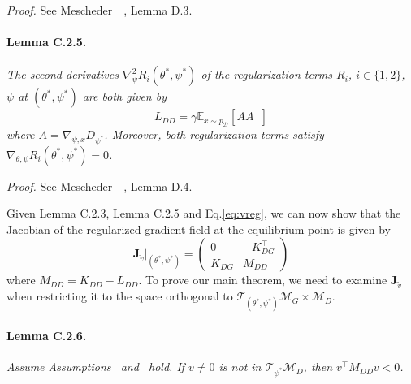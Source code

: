 \emph{Proof.} See Mescheder~\etal~\cite{r1}, Lemma D.3.

\paragraph{Lemma C.2.5.} \emph{The second derivatives $\nabla^2_\psi R_i(\theta^*,\psi^*)$ of the regularization terms $R_i$, $i\in\{1,2\}$,~\wrt $\psi$ at $(\theta^*,\psi^*)$ are both given by}
\begin{equation}
L_{DD}=\gamma\mathbb{E}_{x\sim p_\mathcal{D}}[AA^\top]
\end{equation}
\emph{where $A=\nabla_{\psi,x}D_{\psi^*}$. Moreover, both regularization terms satisfy $\nabla_{\theta,\psi}R_i(\theta^*,\psi^*)=0$.}

\emph{Proof.} See Mescheder~\etal~\cite{r1}, Lemma D.4.

Given Lemma C.2.3, Lemma C.2.5 and Eq.\ref{eq:vreg}, we can now show that the Jacobian of the regularized gradient field at the equilibrium point is given by
\begin{equation}
\textbf{J}_{\tilde{v}}\biggr\vert_{(\theta^*,\psi^*)}=\begin{pmatrix}
0 & -K_{DG}^\top\\ 
K_{DG} & M_{DD}
\end{pmatrix}
\end{equation}
where $M_{DD}=K_{DD}-L_{DD}$. To prove our main theorem, we need to examine $\textbf{J}_{\tilde{v}}$ when restricting it to the space orthogonal to $\mathcal{T}_{(\theta^*,\psi^*)}\mathcal{M}_G\times\mathcal{M}_D$.

\paragraph{Lemma C.2.6.} \emph{Assume Assumptions~ and~ hold. If $v\neq0$ is not in $\mathcal{T}_{\psi^*}\mathcal{M}_D$, then $v^\top M_{DD}v<0$.}

